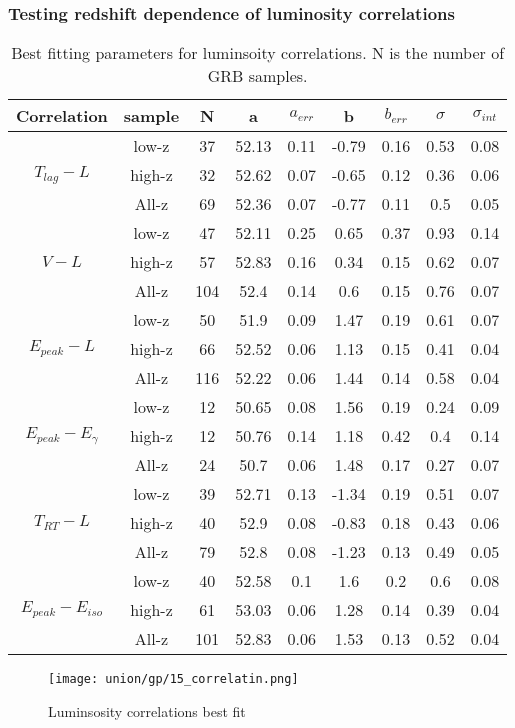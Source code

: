 \subsubsection{Testing redshift dependence of luminosity correlations}
\begin{table}[H]
\centering
\begin{tabular}{|c|c|c|c|c|c|c|c|c|}
\hline
Correlation & sample & N & a & $a_{err}$ & b & $b_{err}$ & $\sigma$ & $\sigma_{int}$\\
\hline
\multirow{3}{*}{$T_{lag}-L$} & low-z & 37 & 52.13 & 0.11 & -0.79 & 0.16 & 0.53 & 0.08\\
\cline{2-9}
 & high-z & 32 & 52.62 & 0.07 & -0.65 & 0.12 & 0.36 & 0.06\\
\cline{2-9}
 & All-z & 69 & 52.36 & 0.07 & -0.77 & 0.11 & 0.5 & 0.05\\
\hline
\multirow{3}{*}{$V-L$} & low-z & 47 & 52.11 & 0.25 & 0.65 & 0.37 & 0.93 & 0.14\\
\cline{2-9}
 & high-z & 57 & 52.83 & 0.16 & 0.34 & 0.15 & 0.62 & 0.07\\
\cline{2-9}
 & All-z & 104 & 52.4 & 0.14 & 0.6 & 0.15 & 0.76 & 0.07\\
\hline
\multirow{3}{*}{$E_{peak}-L$} & low-z & 50 & 51.9 & 0.09 & 1.47 & 0.19 & 0.61 & 0.07\\
\cline{2-9}
 & high-z & 66 & 52.52 & 0.06 & 1.13 & 0.15 & 0.41 & 0.04\\
\cline{2-9}
 & All-z & 116 & 52.22 & 0.06 & 1.44 & 0.14 & 0.58 & 0.04\\
\hline
\multirow{3}{*}{$E_{peak}-E_{\gamma}$} & low-z & 12 & 50.65 & 0.08 & 1.56 & 0.19 & 0.24 & 0.09\\
\cline{2-9}
 & high-z & 12 & 50.76 & 0.14 & 1.18 & 0.42 & 0.4 & 0.14\\
\cline{2-9}
 & All-z & 24 & 50.7 & 0.06 & 1.48 & 0.17 & 0.27 & 0.07\\
\hline
\multirow{3}{*}{$T_{RT}-L$} & low-z & 39 & 52.71 & 0.13 & -1.34 & 0.19 & 0.51 & 0.07\\
\cline{2-9}
 & high-z & 40 & 52.9 & 0.08 & -0.83 & 0.18 & 0.43 & 0.06\\
\cline{2-9}
 & All-z & 79 & 52.8 & 0.08 & -1.23 & 0.13 & 0.49 & 0.05\\
\hline
\multirow{3}{*}{$E_{peak}-E_{iso}$} & low-z & 40 & 52.58 & 0.1 & 1.6 & 0.2 & 0.6 & 0.08\\
\cline{2-9}
 & high-z & 61 & 53.03 & 0.06 & 1.28 & 0.14 & 0.39 & 0.04\\
\cline{2-9}
 & All-z & 101 & 52.83 & 0.06 & 1.53 & 0.13 & 0.52 & 0.04\\
\hline
\end{tabular}
\caption{Best fitting parameters for luminsoity correlations. N is the number of GRB samples.}
\label{table_gp_union}
\end{table}
\begin{figure}[H]
	\centering
	\texttt{[image: union/gp/15\_correlatin.png]}
	\caption{Luminsosity correlations best fit}
	\label{fig:correlation_gp_union}
\end{figure}
